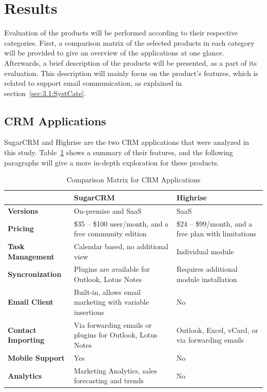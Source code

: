 \section{Results}
\label{sec:3.3:Resul}
Evaluation of the products will be performed according to their respective categories. First, a comparison matrix of the selected products in each category will be provided to give an overview of the applications at one glance. Afterwards, a brief description of the products will be presented, as a part of its evaluation. This description will mainly focus on the product's features, which is related to support email communication, as explained in section~\ref{sec:3.1:SystCate}.

\subsection{CRM Applications}
\label{subsec:3.3.1:CRMAppl}

SugarCRM and Highrise are the two \ac{CRM} applications that were analyzed in this study. Table~\ref{tab:comp_matr_crm} shows a summary of their features, and the following paragraphs will give a more in-depth exploration for these products.

\clearpage

\begin{table}[H]
\begin{center}
	\caption[Comparison Matrix for CRM Applications]{Comparison Matrix for CRM Applications} \label{tab:comp_matr_crm}
    \begin{tabular}{ | p{3cm} | p{5cm} | p{5cm} | }
	\hline
	& \textbf{SugarCRM} & \textbf{Highrise} \\ \hline
	\textbf{Versions} & On-premise and SaaS & SaaS \\ \hline
	\textbf{Pricing} & \$35 -- \$100 user/month, and a free community edition & \$24 -- \$99/month, and a free plan with limitations \\ \hline
	\textbf{Task Management} & Calendar based, no additional view & Individual module \\ \hline
	\textbf{Syncronization} & Plugins are available for Outlook, Lotus Notes & Requires additional module installation \\ \hline
	\textbf{Email Client} & Built-in, allows email marketing with variable insertions & No \\ \hline
	\textbf{Contact Importing} & Via forwarding emails or plugins for Outlook, Lotus Notes & Outlook, Excel, vCard, or via forwarding emails \\ \hline
	\textbf{Mobile Support} & Yes & No \\ \hline
	\textbf{Analytics} & Marketing Analytics, sales forecasting and trends & No \\ \hline
    \end{tabular}
\end{center}
\end{table}

